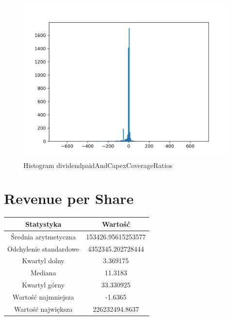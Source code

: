 \documentclass{article}
\begin{document}
\begin{figure}[h!]
    \includegraphics[width=\linewidth]{variables/dividendpaidAndCapexCoverageRatios.png}
    \caption{Histogram dividendpaidAndCapexCoverageRatios }
\end{figure}\section{ Revenue per Share }

\begin{center}
    \begin{tabular}{|c | c|} 
    \hline
    Statystyka & Wartość \\
    \hline\hline
    Średnia arytmetyczna & 153426.95615253577 \\ 
    \hline
    Odchylenie standardowe & 4352345.202728444 \\
    \hline
    Kwartyl dolny & 3.369175 \\
    \hline
    Mediana & 11.3183 \\
    \hline
    Kwartyl górny & 33.330925 \\
    \hline
    Wartość najmniejsza & -1.6365 \\
    \hline
    Wartość największa & 226232494.8637 \\
    \hline
   \end{tabular}
\end{center}
\end{document}
